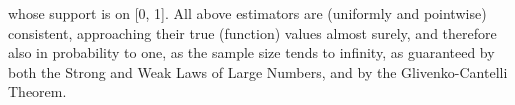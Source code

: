 \documentclass[12pt]{article}
\begin{document}
\noindent whose support is on [0, 1]. All above estimators are (uniformly and pointwise) consistent, approaching their true (function) values almost surely, and therefore also in probability to one, as the sample size tends to infinity, as guaranteed by both the Strong and Weak Laws of Large Numbers, and by the Glivenko-Cantelli Theorem.
\end{document}
